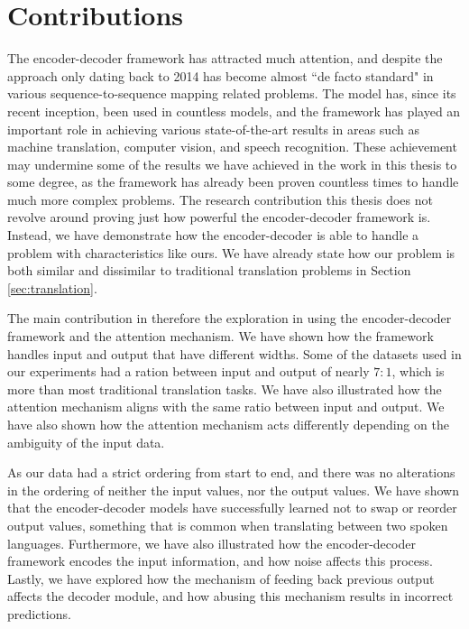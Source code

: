 
\section{Contributions}
\label{sec:contributions_final}

The encoder-decoder framework has attracted much attention, and despite the approach only dating back to 2014 has become almost ``de facto standard" in various sequence-to-sequence mapping related problems. The model has, since its recent inception, been used in countless models, and the framework has played an important role in achieving various state-of-the-art results in areas such as machine translation, computer vision, and speech recognition. These achievement may undermine some of the results we have achieved in the work in this thesis to some degree, as the framework has already been proven countless times to handle much more complex problems. The research contribution this thesis does not revolve around proving just how powerful the encoder-decoder framework is. Instead, we have demonstrate how the encoder-decoder is able to handle a problem with characteristics like ours. We have already state how our problem is both similar and dissimilar to traditional translation problems in Section \ref{sec:translation}.

The main contribution in therefore the exploration in using the encoder-decoder framework and the attention mechanism. We have shown how the framework handles input and output that have different widths. Some of the datasets used in our experiments had a ration between input and output of nearly \(7 : 1\), which is more than most traditional translation tasks. We have also illustrated how the attention mechanism aligns with the same ratio between input and output. We have also shown how the attention mechanism acts differently depending on the ambiguity of the input data.

As our data had a strict ordering from start to end, and there was no alterations in the ordering of neither the input values, nor the output values. We have shown that the encoder-decoder models have successfully learned not to swap or reorder output values, something that is common when translating between two spoken languages. Furthermore, we have also illustrated how the encoder-decoder framework encodes the input information, and how noise affects this process. Lastly, we have explored how the mechanism of feeding back previous output affects the decoder module, and how abusing this mechanism results in incorrect predictions.

